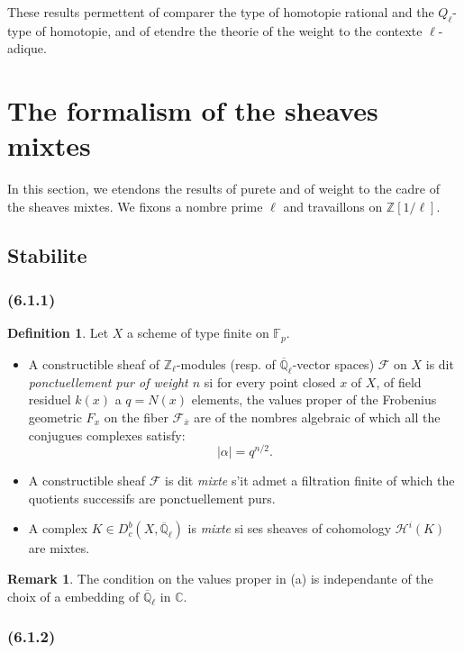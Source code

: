 \documentclass[12pt,a4paper]{article}
\theoremstyle{plain}
\theoremstyle{definition}
\newtheorem{definition}[theorem]{Definition}
\newtheorem{remark}[theorem]{Remark}
\theoremstyle{remark}
\newcommand{\bbZ}{\mathbb{Z}}
\newcommand{\bbC}{\mathbb{C}}
\newcommand{\scrF}{\mathscr{F}}
\newcommand{\scrH}{\mathscr{H}}
\newcommand{\Zl}{\mathbb{Z}_\ell}
\newcommand{\Qlb}{\overline{\mathbb{Q}}_\ell}
\newcommand{\Fp}{\mathbb{F}_p}
\begin{document}
These results permettent of comparer the type of homotopie rational and the $Q_\ell$-type of homotopie, and of etendre the theorie of the weight to the contexte $\ell$-adique.


\section{The formalism of the sheaves mixtes}

In this section, we etendons the results of purete and of weight to the cadre of the sheaves mixtes. We fixons a nombre prime $\ell$ and travaillons on $\bbZ[1/\ell]$.

\subsection{Stabilite}

\subsubsection*{\textup{(6.1.1)}}

\begin{definition}
Let $X$ a scheme of type finite on $\Fp$.
\begin{itemize}
\item[(a)] A constructible sheaf of $\Zl$-modules (resp. of $\Qlb$-vector spaces) $\scrF$ on $X$ is dit \emph{ponctuellement pur of weight $n$} si for every point closed $x$ of $X$, of field residuel $k(x)$ a $q = N(x)$ elements, the values proper of the Frobenius geometric $F_x$ on the fiber $\scrF_{\overline{x}}$ are of the nombres algebraic of which all the conjugues complexes satisfy:
\[
|\alpha| = q^{n/2}.
\]
\item[(b)] A constructible sheaf $\scrF$ is dit \emph{mixte} s'it admet a filtration finite of which the quotients successifs are ponctuellement purs.
\item[(c)] A complex $K \in D_c^b(X, \Qlb)$ is \emph{mixte} si ses sheaves of cohomology $\scrH^i(K)$ are mixtes.
\end{itemize}
\end{definition}

\begin{remark}
The condition on the values proper in (a) is independante of the choix of a embedding of $\Qlb$ in $\bbC$.
\end{remark}

\subsubsection*{\textup{(6.1.2)}}
\end{document}
